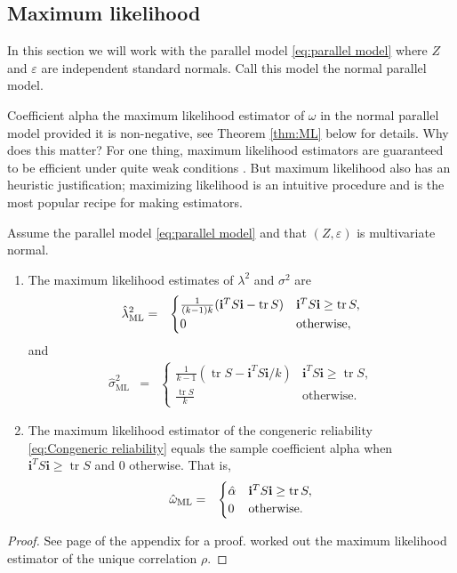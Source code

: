 \documentclass[twoside]{article}
\DeclareMathOperator{\tr}{tr}
\begin{document}
\subsection{Maximum likelihood}
In this section we will work with the parallel model \eqref{eq:parallel model} where $Z$ and $\varepsilon$ are independent standard normals. Call this model the normal parallel model.

Coefficient alpha the maximum likelihood estimator of $\omega$ in the normal parallel model provided it is non-negative, see Theorem \ref{thm:ML} below for details. Why does this matter? For one thing, maximum likelihood estimators are guaranteed to be efficient under quite weak conditions \citep[][Section 7.3]{Lehmann2004-ke}. But maximum likelihood also has an heuristic justification; maximizing likelihood is an intuitive procedure and is the most popular recipe for making estimators.

\begin{thm}\label{thm:ML}
Assume the parallel model \eqref{eq:parallel model} and that $(Z,\varepsilon)$ is multivariate normal. 
\begin{enumerate}[label=(\roman*)]
\item The maximum likelihood estimates of $\lambda^{2}$
and $\sigma^{2}$ are 
\begin{eqnarray*}
\hat{\lambda}^2_\textrm{ML} & = & \begin{cases}
\frac{1}{(k-1)k}(\mathbf{i}^{T}S\mathbf{i}-\tr{S}) & \mathbf{i}^{T}S\mathbf{i}\geq\tr{S},\\
0 & \text{\textrm{otherwise}},
\end{cases}\\
\end{eqnarray*}
and
\begin{eqnarray*}
\hat{\sigma}^2_\textrm{ML} & = & \begin{cases}
\frac{1}{k-1}(\tr{S}-\mathbf{i}^{T}S\mathbf{i}/k) & \mathbf{i}^{T}S\mathbf{i}\geq\tr{S},\\
\frac{\tr{S}}{k} & \textrm{otherwise}.
\end{cases}
\end{eqnarray*}
\item The maximum likelihood estimator of the congeneric reliability
\eqref{eq:Congeneric reliability} equals the sample coefficient alpha
when $\mathbf{i}^{T}S\mathbf{i}\geq\tr{S}$ and $0$ otherwise. That is,
\begin{eqnarray*}
\hat{\omega}_\textrm{ML} & = & \begin{cases}
\hat{\alpha} & \mathbf{i}^{T}S\mathbf{i}\geq\tr{S},\\
0 & \text{\textrm{otherwise}}.
\end{cases}
\end{eqnarray*}
\end{enumerate}
\end{thm}
\begin{proof}
See page \pageref{proof:ML} of the appendix for a proof. \citet[][section B]{Kristof1963-tb} worked out the maximum likelihood estimator of the unique correlation $\rho$. 
\end{proof}
\end{document}
